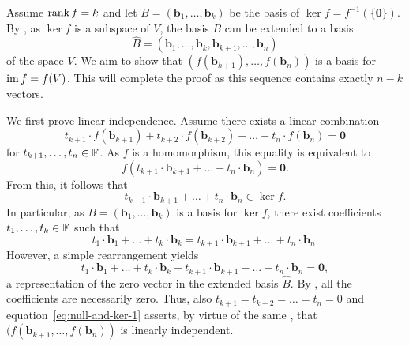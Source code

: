 \begin{propproof}
 Assume $\operatorname{rank} f = k$ and let $B = (\mathbf{b}_1,\ldots,\mathbf{b}_k)$ be the
 basis of $\ker f = f^{-1}(\{\mathbf{0}\})$. By
 , as $\ker f$ is a subspace of $V$, the
 basis $B$ can be extended to a basis
 \[
  \hat{B} =
  (\mathbf{b}_1,\ldots,\mathbf{b}_k,\mathbf{b}_{k+1},\ldots,\mathbf{b}_n)
 \]
 of the space $V$. We aim to show that
 $(f(\mathbf{b}_{k+1}),\ldots,f(\mathbf{b}_n))$ is a basis for $\operatorname{im} f = f(V)$.
 This will complete the proof as this sequence contains exactly $n - k$ vectors.

 We first prove linear independence. Assume there exists a linear combination
 \begin{equation}
  \label{eq:null-and-ker-1}
  t_{k+1} \cdot f(\mathbf{b}_{k+1}) + t_{k+2} \cdot f(\mathbf{b}_{k+2}) + \ldots
  + t_n \cdot f(\mathbf{b}_n) = \mathbf{0}
 \end{equation}
 for $t_{k+1},\ldots,t_n \in \mathbb{F}$. As $f$ is a homomorphism, this equality is
 equivalent to
 \[
  f(t_{k+1} \cdot \mathbf{b}_{k+1} + \ldots + t_n \cdot \mathbf{b}_n) =
  \mathbf{0}.
 \]
 From this, it follows that
 \[
  t_{k+1} \cdot \mathbf{b}_{k+1} + \ldots + t_n \cdot \mathbf{b}_n \in \ker f.
 \]
 In particular, as $B = (\mathbf{b}_1,\ldots,\mathbf{b}_k)$ is a basis for $\ker
 f$, there exist coefficients $t_1,\ldots,t_k \in \mathbb{F}$ such that
 \[
  t_1 \cdot \mathbf{b}_1 + \ldots + t_k \cdot \mathbf{b}_k = t_{k+1} \cdot
  \mathbf{b}_{k+1} + \ldots + t_n \cdot \mathbf{b}_n.
 \]
 However, a simple rearrangement yields
 \[
  t_1 \cdot \mathbf{b}_1 + \ldots + t_k \cdot \mathbf{b}_k - t_{k+1} \cdot
  \mathbf{b}_{k+1} - \ldots - t_n \cdot \mathbf{b}_n = \mathbf{0},
 \]
 a representation of the zero vector in the extended basis $\hat{B}$. By
 , all the coefficients are
 necessarily zero. Thus, also $t_{k+1} = t_{k+2} = \ldots = t_n = 0$ and
 equation~\eqref{eq:null-and-ker-1} asserts, by virtue of the same
 , that
 $(f(\mathbf{b}_{k+1},\ldots,f(\mathbf{b}_n))$ is linearly independent.


\end{propproof}
